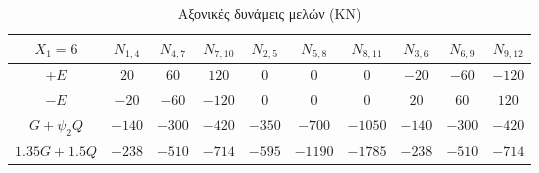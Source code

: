 \begin{landscape}
\begin{table}[h]
\centering\footnotesize
\begin{tabular}{| c || c | c | c | c | c | c | c | c | c |}
\hline
$X_1 = 6$ & $N_{1,4}$ & $N_{4,7}$ & $N_{7,10}$ & $N_{2,5}$ & $N_{5,8}$ & $N_{8,11}$ & $N_{3,6}$ & $N_{6,9}$ & $N_{9,12}$ \\
\hline
\hline
$+E$ & $20$ & $60$ & $120$ & $0$ & $0$ & $0$ & $-20$ & $-60$ & $-120$ \\
\hline
$-E$ & $-20$ & $-60$ & $-120$ & $0$ & $0$ & $0$ & $20$ & $60$ & $120$ \\
\hline
$G+\psi_2 Q$ & $-140$ & $-300$ & $-420$ & $-350$ & $-700$ & $-1050$ & $-140$ & $-300$ & $-420$ \\
\hline
$1.35G+1.5Q$ & $-238$ & $-510$ & $-714$ & $-595$ & $-1190$ & $-1785$ & $-238$ & $-510$ & $-714$ \\
\hline
\end{tabular}
\caption{Αξονικές δυνάμεις μελών (\textlatin{KN})}
\label{tab:axialloads}
\end{table}

\end{landscape}
